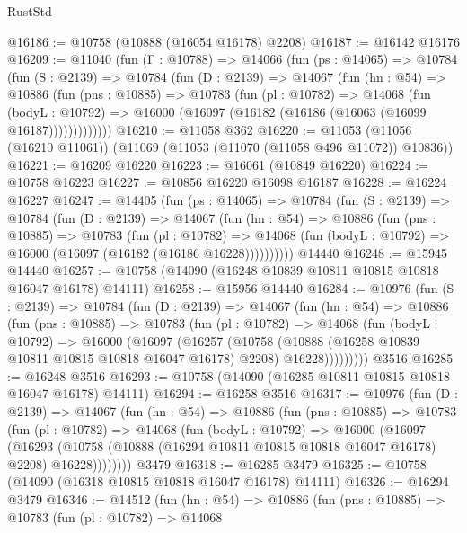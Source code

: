 \begin{lexlean}{RustStd}
\begin{coremodule}
@16186 := @10758 (@10888 (@16054 @16178) @2208)
@16187 := @16142 @16176
@16209 := @11040
    (fun (Γ : @10788) =>
    @14066
      (fun (ps : @14065) =>
      @10784
        (fun (S : @2139) =>
        @10784
          (fun (D : @2139) =>
          @14067
            (fun (hn : @54) =>
            @10886
              (fun (pns : @10885) =>
              @10783
                (fun (pl : @10782) =>
                @14068
                  (fun (bodyL : @10792) =>
                  @16000 (@16097 (@16182 (@16186 (@16063 (@16099 @16187)))))))))))))
@16210 := @11058 @362
@16220 := @11053 (@11056 (@16210 @11061)) (@11069 (@11053 (@11070 (@11058 @496 @11072)) @10836))
@16221 := @16209 @16220
@16223 := @16061 (@10849 @16220)
@16224 := @10758 @16223
@16227 := @10856 @16220 @16098 @16187
@16228 := @16224 @16227
@16247 := @14405
    (fun (ps : @14065) =>
    @10784
      (fun (S : @2139) =>
      @10784
        (fun (D : @2139) =>
        @14067
          (fun (hn : @54) =>
          @10886
            (fun (pns : @10885) =>
            @10783
              (fun (pl : @10782) =>
              @14068 (fun (bodyL : @10792) => @16000 (@16097 (@16182 (@16186 @16228))))))))))
    @14440
@16248 := @15945 @14440
@16257 := @10758 (@14090 (@16248 @10839 @10811 @10815 @10818 @16047 @16178) @14111)
@16258 := @15956 @14440
@16284 := @10976
    (fun (S : @2139) =>
    @10784
      (fun (D : @2139) =>
      @14067
        (fun (hn : @54) =>
        @10886
          (fun (pns : @10885) =>
          @10783
            (fun (pl : @10782) =>
            @14068
              (fun (bodyL : @10792) =>
              @16000
                (@16097
                  (@16257
                    (@10758
                      (@10888 (@16258 @10839 @10811 @10815 @10818 @16047 @16178) @2208)
                      @16228)))))))))
    @3516
@16285 := @16248 @3516
@16293 := @10758 (@14090 (@16285 @10811 @10815 @10818 @16047 @16178) @14111)
@16294 := @16258 @3516
@16317 := @10976
    (fun (D : @2139) =>
    @14067
      (fun (hn : @54) =>
      @10886
        (fun (pns : @10885) =>
        @10783
          (fun (pl : @10782) =>
          @14068
            (fun (bodyL : @10792) =>
            @16000
              (@16097
                (@16293
                  (@10758 (@10888 (@16294 @10811 @10815 @10818 @16047 @16178) @2208) @16228))))))))
    @3479
@16318 := @16285 @3479
@16325 := @10758 (@14090 (@16318 @10815 @10818 @16047 @16178) @14111)
@16326 := @16294 @3479
@16346 := @14512
    (fun (hn : @54) =>
    @10886
      (fun (pns : @10885) =>
      @10783
        (fun (pl : @10782) =>
        @14068

\end{coremodule}
\end{lexlean}
